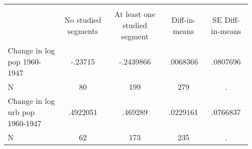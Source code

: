 \begin{tabular}{l*{4}{c}}
\hline\hline
            &\multicolumn{4}{c}{}                               \\
            &No studied segments&At least one studied segment&Diff-in-means&SE Diff-in-means\\
\hline
Change in log pop 1960-1947&     -.23715&   -.2439866&    .0068366&    .0807696\\
N           &          80&         199&         279&           .\\
Change in log urb pop 1960-1947&    .4922051&     .469289&    .0229161&    .0766837\\
N           &          62&         173&         235&           .\\
\hline\hline
\end{tabular}
